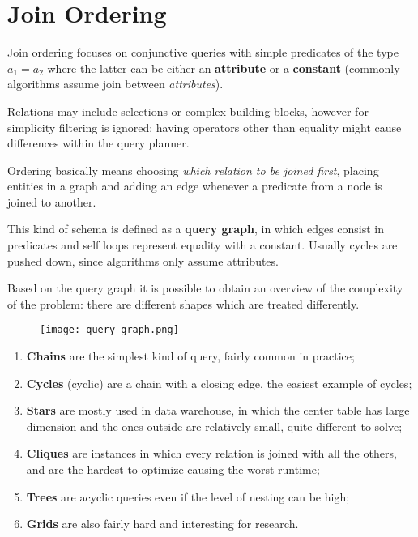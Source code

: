 \section{Join Ordering}
Join ordering focuses on conjunctive queries with simple predicates of the type $a_1 = a_2$ where the latter can be either an \textbf{attribute} or a \textbf{constant} (commonly algorithms assume join between \textit{attributes}).

Relations may include selections or complex building blocks, however for simplicity filtering is ignored; having operators other than equality might cause differences within the query planner.

Ordering basically means choosing \textit{which relation to be joined first}, placing entities in a graph and adding an edge whenever a predicate from a node is joined to another. 

This kind of schema is defined as a \textbf{query graph}, in which edges consist in predicates and self loops represent equality with a constant. Usually cycles are pushed down, since algorithms only assume attributes. 

Based on the query graph it is possible to obtain an overview of the complexity of the problem: there are different shapes which are treated differently. 

\begin{figure}[h]
	\texttt{[image: query\_graph.png]}
	\centering
\end{figure}

\begin{enumerate}
	\item \textbf{Chains} are the simplest kind of query, fairly common in practice;
	\item \textbf{Cycles} (cyclic) are a chain with a closing edge, the easiest example of cycles;
	\item \textbf{Stars} are mostly used in data warehouse, in which the center table has large dimension and the ones outside are relatively small, quite different to solve;
	\item \textbf{Cliques} are instances in which every relation is joined with all the others, and are the hardest to optimize causing the worst runtime;
	\item \textbf{Trees} are acyclic queries even if the level of nesting can be high;
	\item \textbf{Grids} are also fairly hard and interesting for research.
\end{enumerate}

